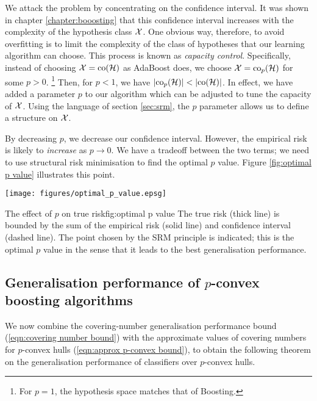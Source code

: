 We attack the problem by concentrating on the confidence interval.
It was shown in chapter \ref{chapter:booosting} that this confidence
interval increases with the complexity of the hypothesis class
$\mathcal{X}$.  One obvious way, therefore, to avoid overfitting is to limit
the complexity of the class of hypotheses that our learning algorithm
can choose.  This process is known as \emph{capacity control}.
Specifically, instead of choosing $\mathcal{X} = \mathrm{co} (\mathcal{H})$ as AdaBoost
does, we choose $\mathcal{X} = \mathrm{co}_p(\mathcal{H})$ for some $p > 0$.%
\footnote{For $p=1$, the hypothesis space matches that of Boosting.}
Then, for $p < 1$, we have $|\mathrm{co}_p (\mathcal{H})| < |\mathrm{co} (\mathcal{H})|$.  In
effect, we have added a parameter $p$ to our algorithm which can be
adjusted to tune the capacity of $\mathcal{X}$.  Using the language of
section \ref{sec:srm}, the $p$ parameter allows us to define a
structure on $\mathcal{X}$.

By decreasing $p$, we decrease our confidence interval.  However, the
empirical risk is likely to \emph{increase} as $p \rightarrow 0$.
We have a tradeoff between the two terms; we need to use structural
risk minimisation to find the optimal $p$ value.  Figure
\ref{fig:optimal p value} illustrates this point.

\begin{linefigure}
\begin{center}
\texttt{[image: figures/optimal\_p\_value.epsg]}
\end{center}
\begin{capt}{The effect of $p$ on true risk}{fig:optimal p value}
The true risk (thick line) is bounded by the sum of the empirical risk
(solid line) and confidence interval (dashed line).  The point chosen
by the SRM principle is indicated; this is the optimal $p$ value in
the sense that it leads to the best generalisation performance.
\end{capt}
\end{linefigure}

\subsection{Generalisation performance of $p$-convex boosting
algorithms}

We now combine the covering-number generalisation performance bound
(\ref{eqn:covering number bound}) with the approximate values of
covering numbers for $p$-convex hulls (\ref{eqn:approx p-convex
bound}), to obtain the following theorem on the generalisation
performance of classifiers over $p$-convex hulls.

